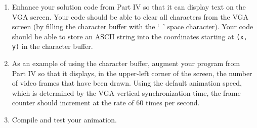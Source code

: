 \documentclass[epsfig,10pt,fullpage]{article}
\newcommand{\CommonDocsPath}{../../../../common/docs}
\begin{document}
\begin{enumerate}
\item Enhance your solution code from Part IV so that it can display text on the VGA screen. 
Your code should be able to clear all characters from the VGA screen (by filling the
character buffer with the `~' space character). Your code should be able to store an ASCII 
string into the coordinates starting at \texttt{(x, y)} in the character buffer. 
\item As an example of using the character buffer, augment your program from Part IV so that 
it displays, in the upper-left corner of the screen, the number of video frames that have 
been drawn. Using the default animation speed, which is determined by the VGA vertical 
synchronization time, the frame counter should increment at the rate of 60 times per second.
\item Compile and test your animation.
\end{enumerate}


\end{document}
